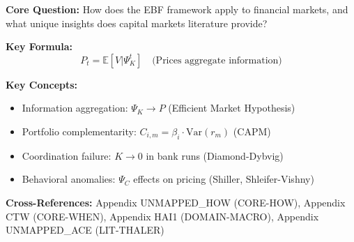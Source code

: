 
\begin{abstract}
This appendix demonstrates how the EBF framework $(C, \Psi, C^*, K, Q)$ operates
in financial market contexts. Financial markets provide unique testing grounds:
rapid information aggregation ($\Psi_K \to P$), explicit complementarity structures
($C_{ij}^{portfolio}$ as covariances), coordination failures ($K \to 0$ in crises),
and measurable outcomes ($Q$ as returns, volatility, welfare). We integrate
20 foundational papers spanning efficient markets, asset pricing, behavioral
finance, corporate finance, banking crises, and derivatives. The synthesis
reveals how EBF unifies diverse financial phenomena under a common framework.
\end{abstract}

\begin{tcolorbox}[colback=blue!5!white, colframe=blue!75!black,
    title=Quick Reference: Capital Markets]

\textbf{Core Question:} How does the EBF framework apply to financial markets,
and what unique insights does capital markets literature provide?

\textbf{Key Formula:}
\begin{equation}
P_t = \mathbb{E}[V | \Psi_K^t] \quad \text{(Prices aggregate information)}
\end{equation}

\textbf{Key Concepts:}
\begin{itemize}[nosep]
\item Information aggregation: $\Psi_K \to P$ (Efficient Market Hypothesis)
\item Portfolio complementarity: $C_{i,m} = \beta_i \cdot \text{Var}(r_m)$ (CAPM)
\item Coordination failure: $K \to 0$ in bank runs (Diamond-Dybvig)
\item Behavioral anomalies: $\Psi_C$ effects on pricing (Shiller, Shleifer-Vishny)
\end{itemize}

\textbf{Cross-References:} Appendix UNMAPPED_HOW (CORE-HOW), Appendix CTW (CORE-WHEN),
Appendix HAI1 (DOMAIN-MACRO), Appendix UNMAPPED_ACE (LIT-THALER)
\end{tcolorbox}



